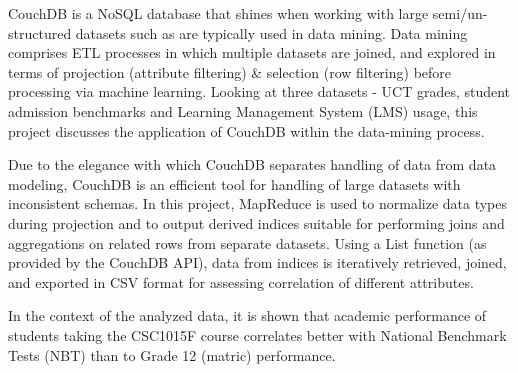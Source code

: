 CouchDB is a NoSQL database that shines when working with large semi/un-structured datasets such as are typically used in data mining. Data mining comprises ETL processes in which multiple datasets are joined, and explored in terms of projection (attribute filtering) \& selection (row filtering) before processing via machine learning. Looking at three datasets - UCT grades, student admission benchmarks and Learning Management System (LMS) usage, this project discusses the application of CouchDB within the data-mining process.

Due to the elegance with which CouchDB separates handling of data from data modeling, CouchDB is an efficient tool for handling of large datasets with inconsistent schemas. In this project, MapReduce is used to normalize data types during projection and to output derived indices suitable for performing joins and aggregations on related rows from separate datasets. Using a List function (as provided by the CouchDB API), data from indices is iteratively retrieved, joined, and exported in CSV format for assessing correlation of different attributes.

In the context of the analyzed data, it is shown that academic performance of students taking the CSC1015F course correlates better with National Benchmark Tests (NBT) than to Grade 12 (matric) performance.
